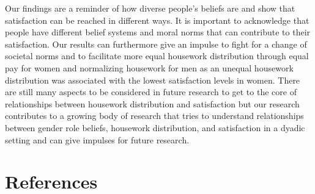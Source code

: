 \documentclass[
  man,floatsintext]{apa6}
\begin{document}
Our findings are a reminder of how diverse people's beliefs are and show that satisfaction can be reached in different ways. It is important to acknowledge that people have different belief systems and moral norms that can contribute to their satisfaction.
Our results can furthermore give an impulse to fight for a change of societal norms and to facilitate more equal housework distribution through equal pay for women and normalizing housework for men as an unequal housework distribution was associated with the lowest satisfaction levels in women.
There are still many aspects to be considered in future research to get to the core of relationships between housework distribution and satisfaction but our research contributes to a growing body of research that tries to understand relationships between gender role beliefs, housework distribution, and satisfaction in a dyadic setting and can give impulses for future research.

\newpage

\hypertarget{references}{%
\section{References}\label{references}}
\end{document}
